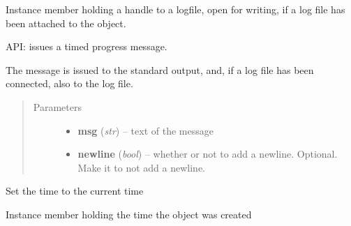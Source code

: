 \documentclass[letterpaper,10pt,english]{sphinxmanual}
\begin{document}
\begin{fulllineitems}
\begin{fulllineitems}
\begin{quote}
\begin{description}
\end{description}\end{quote}

\end{fulllineitems}


\begin{fulllineitems}
\label{graf/graf:graf.timestamp.Timestamp.log}
Instance member holding a handle to a logfile, open for writing, if a log file has been attached to the object.

\end{fulllineitems}


\begin{fulllineitems}
\label{graf/graf:graf.timestamp.Timestamp.progress}
API: issues a timed progress message.

The message is issued to the standard output, and, if a log file has been connected, also to the log file.
\begin{quote}\begin{description}
\item[{Parameters}] \leavevmode\begin{itemize}
\item {} 
\textbf{msg} (\emph{str}) --
text of the message

\item {} 
\textbf{newline} (\emph{bool}) --
whether or not to add a newline. Optional. Make it  to not add a newline.

\end{itemize}

\end{description}\end{quote}

\end{fulllineitems}


\begin{fulllineitems}
\label{graf/graf:graf.timestamp.Timestamp.reset}
Set the time to the current time

\end{fulllineitems}


\begin{fulllineitems}
\label{graf/graf:graf.timestamp.Timestamp.timestamp}
Instance member holding the time the object was created

\end{fulllineitems}


\end{fulllineitems}
\end{document}
